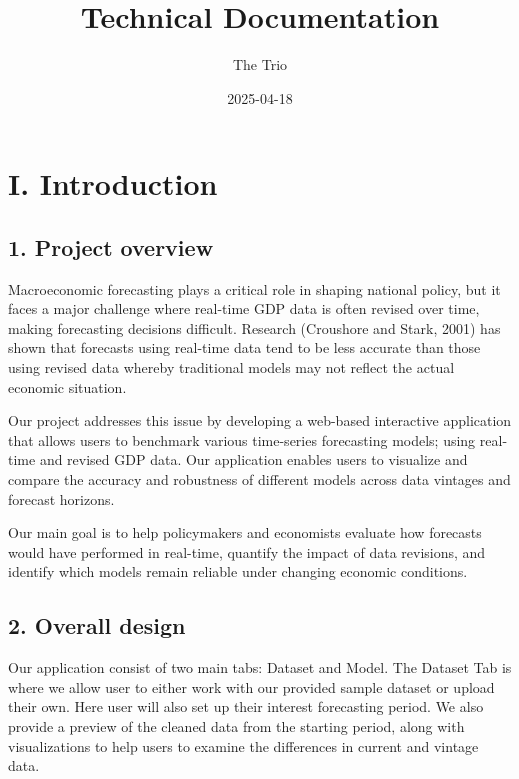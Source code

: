 \documentclass[
]{article}
\title{Technical Documentation}
\author{The Trio}
\date{2025-04-18}
\begin{document}
\maketitle

\hypertarget{i.-introduction}{%
\section{I. Introduction}\label{i.-introduction}}

\hypertarget{project-overview}{%
\subsection{1. Project overview}\label{project-overview}}

Macroeconomic forecasting plays a critical role in shaping national
policy, but it faces a major challenge where real-time GDP data is often
revised over time, making forecasting decisions difficult. Research
(Croushore and Stark, 2001) has shown that forecasts using real-time
data tend to be less accurate than those using revised data whereby
traditional models may not reflect the actual economic situation.

Our project addresses this issue by developing a web-based interactive
application that allows users to benchmark various time-series
forecasting models; using real-time and revised GDP data. Our
application enables users to visualize and compare the accuracy and
robustness of different models across data vintages and forecast
horizons.

Our main goal is to help policymakers and economists evaluate how
forecasts would have performed in real-time, quantify the impact of data
revisions, and identify which models remain reliable under changing
economic conditions.

\hypertarget{overall-design}{%
\subsection{2. Overall design}\label{overall-design}}

Our application consist of two main tabs: Dataset and Model. The Dataset
Tab is where we allow user to either work with our provided sample
dataset or upload their own. Here user will also set up their interest
forecasting period. We also provide a preview of the cleaned data from
the starting period, along with visualizations to help users to examine
the differences in current and vintage data.
\end{document}
